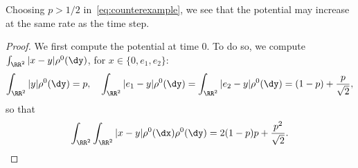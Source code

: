 Choosing $p>1/2$ in~\eqref{eq:counterexample}, we see that the potential may increase at the same rate as the time step.

\begin{proof}
We first compute the potential at time $0$. To do so, we compute $\int_{\RR^2} \vert x- y \vert \rho^0(\dy)$, for $x \in \{0,e_{1},e_{2}\}$:
\begin{equation*}
\int_{\RR^2} \vert y \vert \rho^0(\dy) = p, \quad
\int_{\RR^2} \vert e_{1}- y \vert \rho^0(\dy) = \int_{\RR^2} \vert e_{2}- y \vert \rho^0(\dy) = (1-p) + \frac{p}{\sqrt{2}},
\end{equation*}
so that
\begin{equation*}
\int_{\RR^2}\int_{\RR^2} \vert x- y \vert\rho^0(\dx) \rho^0(\dy) = 2 (1-p) p + \frac{p^2}{\sqrt{2}}.
\end{equation*}


\end{proof}
